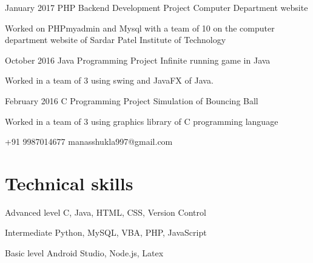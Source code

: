 \documentclass{tccv}
\begin{document}
\begin{eventlist}

\item{January 2017}
     {PHP Backend Development Project}
     {Computer Department website}
     
     Worked on PHPmyadmin and Mysql with a team of 10
     on the computer department website of Sardar Patel Institute
     of Technology

\item{October 2016}
     {Java Programming Project}
     {Infinite running game in Java}
     
     Worked in a team of 3 using swing and JavaFX of Java.

\item{February 2016}
     {C Programming Project}
     {Simulation of Bouncing Ball}
     
     Worked in a team of 3 using graphics library of C
     programming language

\end{eventlist}

    {+91 9987014677}
    {manasshukla997@gmail.com}

\section{Technical skills}

\begin{factlist}

\item{Advanced level}
     {C, Java, HTML, CSS, Version Control}

\item{Intermediate}
     {Python, MySQL, VBA, PHP, JavaScript}

\item{Basic level}
     {Android Studio, Node.js, Latex}

\end{factlist}
\end{document}

